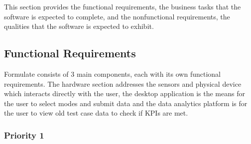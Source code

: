 \documentclass[12pt]{article}
\begin{document}
This section provides the functional requirements, the business tasks that the
software is expected to complete, and the nonfunctional requirements, the
qualities that the software is expected to exhibit.

\subsection{Functional Requirements}
Formulate consists of 3 main components, each with its own functional requirements. The hardware section addresses the sensors and physical device which interacts directly with the user, the desktop application is the means for the user to select modes and submit data and the data analytics platform is for the user to view old test case data to check if KPIs are met.

\subsubsection{Priority 1} 
\end{document}
